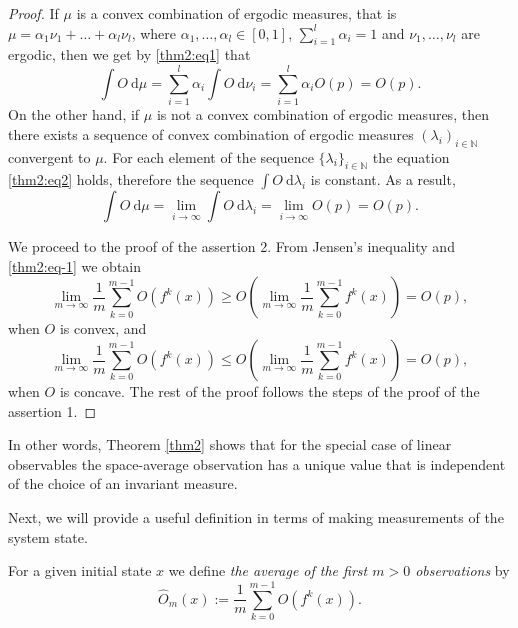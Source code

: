 \documentclass[format=acmsmall, authorversion, screen=true]{acmart}
\def\R{\ensuremath{\mathbb{R}}}
\def\N{\ensuremath{\mathbb{N}}}
\def\dmu{\mathrm{d}\mu}
\def\dnu{\mathrm{d}\nu}
\def\dl{\mathrm{d}\lambda}
\begin{document}
\begin{proof}
If $\mu$ is a convex combination of ergodic measures, that is $\mu = \alpha_1 \nu_1 + \ldots + \alpha_l \nu_l$, where $\alpha_1, \ldots, \alpha_l \in [0,1]$, $\sum_{i=1}^l \alpha_i = 1$ and $\nu_1, \ldots, \nu_l$ are ergodic, then we get by \eqref{thm2:eq1} that
\begin{equation}\label{thm2:eq2}
 \int O\: \dmu = \sum_{i=1}^l \alpha_i \int O\: \dnu_i = \sum_{i=1}^l \alpha_i O(p) = O(p).
\end{equation}
On the other hand, if $\mu$ is not a convex combination of ergodic measures, then there exists a sequence of convex combination of ergodic measures $(\lambda_i)_{i \in \N}$ convergent to $\mu$. For each element of the sequence $\{\lambda_i\}_{i \in \N}$ the equation \eqref{thm2:eq2} holds, therefore the sequence $\int O\: \dl_i$ is constant. As a result,
\[
 \int O\: \dmu = \lim_{i \to \infty} \int O\: \dl_i = \lim_{i \to \infty} O(p) = O(p).
\]

We proceed to the proof of the assertion 2.
From Jensen's inequality and \eqref{thm2:eq-1} we obtain
\[
 \lim\limits_{m \to \infty} \frac{1}{m} \sum_{k=0}^{m-1} O(f^k(x)) \geqslant O \left( \lim\limits_{m \to \infty} \frac{1}{m} \sum_{k=0}^{m-1} f^k(x) \right) = O(p),
\]
when $O$ is convex, and
\[
 \lim\limits_{m \to \infty} \frac{1}{m} \sum_{k=0}^{m-1} O(f^k(x)) \leqslant O \left( \lim\limits_{m \to \infty} \frac{1}{m} \sum_{k=0}^{m-1} f^k(x) \right) = O(p),
\]
when $O$ is concave. The rest of the proof follows the steps of the proof of the assertion 1.
\end{proof}

In other words, Theorem \ref{thm2} shows that for the special case of linear observables the space-average observation has a unique value that is independent of the choice of an invariant measure.

Next, we will provide a useful definition in terms of making
measurements of the system state.

For a given initial state $x$ we define \emph{the average of the
first $m>0$ observations} by
\begin{equation}
\hat{O}_m(x) := \frac{1}{m} \sum_{k=0}^{m-1} O(f^{k}(x)).
\end{equation}
\end{document}
